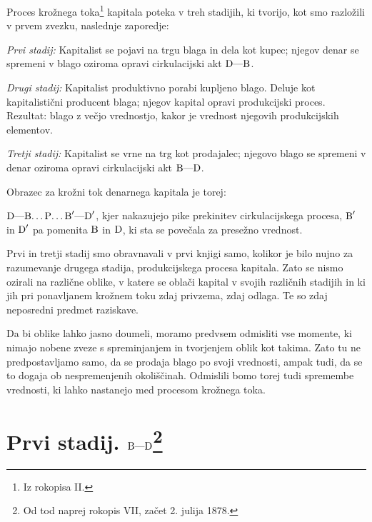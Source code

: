 \documentclass[kapital_02.tex]{subfiles}
\begin{document}
Proces krožnega toka\footnote{Iz rokopisa II.} kapitala poteka v treh stadijih, ki tvorijo, kot smo razložili v prvem zvezku, naslednje zaporedje:

\emph{Prvi stadij:} Kapitalist se pojavi na trgu blaga in dela kot kupec; njegov denar se spremeni v blago oziroma opravi cirkulacijski akt \( \textrm{D}\textrm{---}\textrm{B} \).

\emph{Drugi stadij:} Kapitalist produktivno porabi kupljeno blago. Deluje kot kapitalistični producent blaga; njegov kapital opravi produkcijski proces. Rezultat: blago z večjo vrednostjo, kakor je vrednost njegovih produkcijskih elementov.

\emph{Tretji stadij:} Kapitalist se vrne na trg kot prodajalec; njegovo blago se spremeni v denar oziroma opravi cirkulacijski akt \( \textrm{B}\textrm{---}\textrm{D} \).

Obrazec za krožni tok denarnega kapitala je torej:

\( \textrm{D}\textrm{---}\textrm{B}\textrm{\dots}\textrm{P}\textrm{\dots}\textrm{B}'\textrm{---}\textrm{D}' \), kjer nakazujejo pike prekinitev cirkulacijskega procesa, \( \textrm{B}' \) in \( \textrm{D}' \) pa pomenita \( \textrm{B} \) in \( \textrm{D} \), ki sta se povečala za presežno vrednost.

Prvi in tretji stadij smo obravnavali v prvi knjigi samo, kolikor je bilo nujno za razumevanje drugega stadija, produkcijskega procesa kapitala. Zato se nismo ozirali na različne oblike, v katere se oblači kapital v svojih različnih stadijih in ki jih pri ponavljanem krožnem toku zdaj privzema, zdaj odlaga. Te so zdaj neposredni predmet raziskave.

Da bi oblike lahko jasno doumeli, moramo predvsem odmisliti vse momente, ki nimajo nobene zveze s spreminjanjem in tvorjenjem oblik kot takima. Zato tu ne predpostavljamo samo, da se prodaja blago po svoji vrednosti, ampak tudi, da se to dogaja ob nespremenjenih okoliščinah. Odmislili bomo torej tudi spremembe vrednosti, ki lahko nastanejo med procesom krožnega toka.

\section{Prvi stadij. \( \textrm{B}\textrm{---}\textrm{D} \)\footnote{Od tod naprej rokopis VII, začet 2. julija 1878.}}
\end{document}
